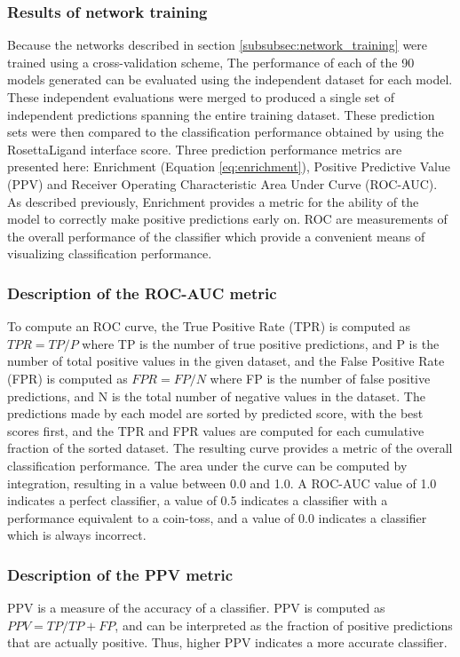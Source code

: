 \subsubsection{Results of network training}

Because the networks described in section \ref{subsubsec:network_training} were trained using a cross-validation scheme, The performance of each of the 90 models generated can be evaluated using the independent dataset for each model.
These independent evaluations were merged to produced a single set of independent predictions spanning the entire training dataset.
These prediction sets were then compared to the classification performance obtained by using the RosettaLigand interface score.
Three prediction performance metrics are presented here: Enrichment (Equation \ref{eq:enrichment}), Positive Predictive Value (PPV) and Receiver Operating Characteristic Area Under Curve (ROC-AUC). 
As described previously, Enrichment provides a metric for the ability of the model to correctly make positive predictions early on.
ROC are measurements of the overall performance of the classifier which provide a convenient means of visualizing classification performance. 

\subsubsection{Description of the ROC-AUC metric}
To compute an ROC curve, the True Positive Rate (TPR) is computed as $TPR=TP/P$ where TP is the number of true positive predictions, and P is the number of total positive values in the given dataset, and the False Positive Rate (FPR) is computed as $FPR=FP/N$ where FP is the number of false positive predictions, and N is the total number of negative values in the dataset.
The predictions made by each model are sorted by predicted score, with the best scores first, and the TPR and FPR values are computed for each cumulative fraction of the sorted dataset.
The resulting curve provides a metric of the overall classification performance.
The area under the curve can be computed by integration, resulting in a value between 0.0 and 1.0.
A ROC-AUC value of 1.0 indicates a perfect classifier, a value of 0.5 indicates a classifier with a performance equivalent to a coin-toss, and a value of 0.0 indicates a classifier which is always incorrect.

\subsubsection{Description of the PPV metric}
PPV is a measure of the accuracy of a classifier.  
PPV is computed as $PPV=TP/TP+FP$, and can be interpreted as the fraction of positive predictions that are actually positive.
Thus, higher PPV indicates a more accurate classifier.

